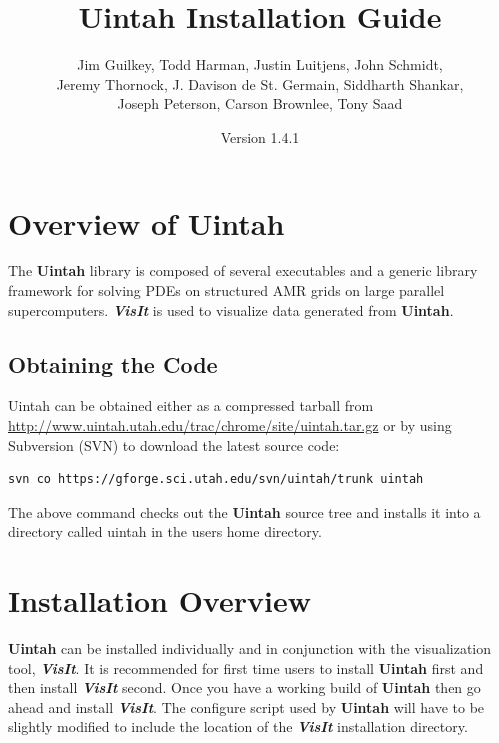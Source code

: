 \documentclass[12pt]{article}
\begin{document}
\title{Uintah Installation Guide}

\author{Jim Guilkey, Todd Harman, Justin Luitjens, John Schmidt,
  \\ Jeremy Thornock,
  J. Davison de St. Germain, Siddharth Shankar, \\
  Joseph Peterson,  
  Carson Brownlee,
  Tony Saad}

\date{Version 1.4.1}

\maketitle



\newpage

\tableofcontents

\newpage

\section{Overview of Uintah} \label{sec:overview} The \textbf{Uintah}
library is composed of several executables and a generic library
framework for solving PDEs on structured AMR grids on large parallel
supercomputers. \textbf{\emph{VisIt}} is used to visualize data
generated from \textbf{Uintah}.

\subsection{Obtaining the Code}
Uintah can be obtained either as a compressed tarball from
\url{http://www.uintah.utah.edu/trac/chrome/site/uintah.tar.gz} or by
using Subversion (SVN) to download the latest source code:

\begin{verbatim}
svn co https://gforge.sci.utah.edu/svn/uintah/trunk uintah
\end{verbatim}

The above command checks out the \textbf{Uintah} source tree and
installs it into a directory called uintah in the users home
directory.


\section{Installation Overview}

\textbf{Uintah} can be installed individually and in conjunction with
the visualization tool, \textbf{\emph{VisIt}}.  It is recommended for
first time users to install \textbf{Uintah} first and then install
\textbf{\emph{VisIt}} second. Once you have a working build of
\textbf{Uintah} then go ahead and install \textbf{\emph{VisIt}}.  The
configure script used by \textbf{Uintah} will have to be slightly
modified to include the location of the \textbf{\emph{VisIt}}
installation directory.  
\end{document}
